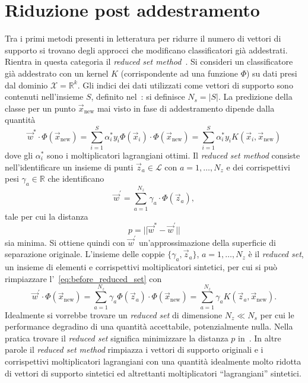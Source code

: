 \section{Riduzione post addestramento}\label{sec:sparsesvm:post_processing}
Tra i primi metodi presenti in letteratura per ridurre il numero di vettori di supporto si trovano degli approcci che modificano classificatori già addestrati. 
Rientra in questa categoria il \emph{reduced set method}~\cite{reduced_set_method}.
Si consideri un classificatore già addestrato con un kernel $K$ (corrispondente ad una funzione $\Phi$) su dati presi dal dominio $\mathcal{X}=\mathbb{R}^k$. Gli indici dei dati utilizzati come vettori di supporto sono contenuti nell'insieme $S$, definito nel~: si definisce $N_s=|S|$. 
La predizione della classe per un punto $\Vec{x}_\text{new}$ mai visto in fase di addestramento dipende dalla quantità
\begin{equation}\label{eq:before_reduced_set}
\Vec{w}^*\cdot\Phi(\Vec{x}_\text{new}) = \sum_{i=1}^{S} \alpha^*_iy_i\Phi(\Vec{x}_i) \cdot \Phi(\Vec{x}_\text{new}) = \sum_{i=1}^{S} \alpha^*_iy_iK(\Vec{x}_i, \Vec{x}_\text{new})
\end{equation}
dove gli $\alpha^*_i$ sono i moltiplicatori lagrangiani ottimi. 
Il \emph{reduced set method} consiste nell'identificare un insieme di punti $\Vec{z}_a \in \mathcal{L}$ con $a=1,\dots,N_z$ e dei corrispettivi pesi $\gamma_a \in \mathbb{R}$ che identificano 
\begin{equation*}
    \Vec{w}^{'} = \sum_{a=1}^{N_z}\gamma_a\cdot\Phi(\Vec{z}_a),
\end{equation*} 
tale per cui la distanza 
\begin{equation}\label{eq:reduced_set_p_distance}
    p = ||\Vec{w}^*-\Vec{w}^{'}||
\end{equation} 
sia minima. Si ottiene quindi con $\Vec{w}^{'}$ un'approssimazione della superficie di separazione originale.
L'insieme delle coppie $\{\gamma_a, \Vec{z}_a\}$, $a=1,\dots, N_z$ è il \emph{reduced set}, un insieme di elementi e corrispettivi moltiplicatori sintetici, per cui si può rimpiazzare l'~\cref{eq:before_reduced_set} con 
\begin{equation}\label{eq:reduced_set}
\Vec{w}^{'} \cdot \Phi(\Vec{x}_\text{new}) = \sum_{a=1}^{N_z}\gamma_a \Phi(\Vec{z}_a) \cdot \Phi(\Vec{x}_\text{new}) = \sum_{a=1}^{N_z}\gamma_a K(\Vec{z}_a, \Vec{x}_\text{new}).
\end{equation}
Idealmente si vorrebbe trovare un \emph{reduced set} di dimensione $N_z \ll N_s$ per cui le performance degradino di una quantità accettabile, potenzialmente nulla.
Nella pratica trovare il \emph{reduced set} significa minimizzare la distanza $p$ in~. 
In altre parole il \emph{reduced set method} rimpiazza i vettori di supporto originali e i corrispettivi moltiplicatori lagrangiani con una quantità idealmente molto ridotta di vettori di supporto sintetici ed altrettanti moltiplicatori ``lagrangiani'' sintetici. 

